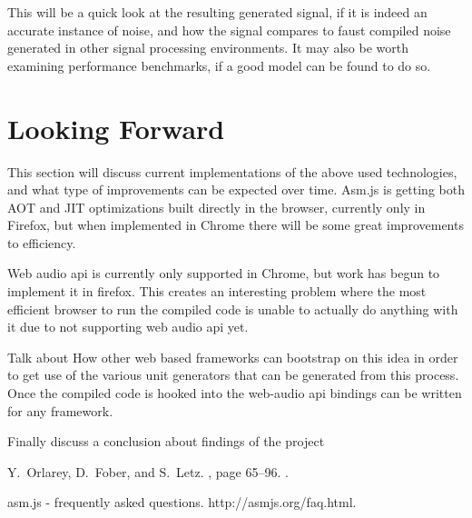 \documentclass[runningheads,a4paper]{llncs}
\begin{document}
This will be a quick look at the resulting generated signal, if it is indeed an accurate instance of noise, and how the signal compares to faust compiled noise generated in other signal processing environments.  It may also be worth examining performance benchmarks, if a good model can be found to do so.

\section{Looking Forward}

This section will discuss current implementations of the above used technologies, and what type of improvements can be expected over time.  Asm.js is getting both AOT and JIT optimizations built directly in the browser, currently only in Firefox, but when implemented in Chrome there will be some great improvements to efficiency.  

Web audio api is currently only supported in Chrome, but work has begun to implement it in firefox.  This creates an interesting problem where the most efficient browser to run the compiled code is unable to actually do anything with it due to not supporting web audio api yet.

Talk about How other web based frameworks can bootstrap on this idea in order to get use of the various unit generators that can be generated from this process.  Once the compiled code is hooked into the web-audio api bindings can be written for any framework.

Finally discuss a conclusion about findings of the project

\begin{thebibliography}{1}
	
	Y.~Orlarey, D.~Fober, and S.~Letz.
	,
	  page 65–96.
	.
	
	asm.js - frequently asked questions.
	\newblock http://asmjs.org/faq.html.
	
\end{thebibliography}
\end{document}

